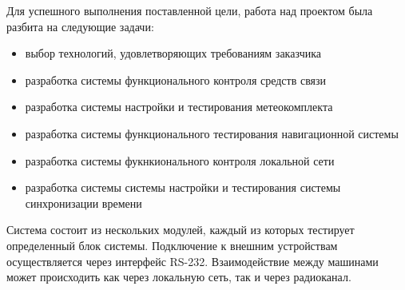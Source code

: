 Для успешного выполнения поставленной цели, работа над проектом была разбита на следующие задачи:
\begin{itemize}
    \item выбор технологий, удовлетворяющих требованиям заказчика
    \item разработка системы функционального контроля средств связи
    \item разработка системы настройки и тестирования метеокомплекта
    \item разработка системы функционального тестирования навигационной системы
    \item разработка системы фукнкионального контроля локальной сети
    \item разработка системы системы настройки и тестирования системы синхронизации времени
\end{itemize}

Система состоит из нескольких модулей, каждый из которых тестирует определенный блок системы.
Подключение к внешним устройствам осуществляется через интерфейс RS-232.
Взаимодействие между машинами может происходить как через локальную сеть, так и через радиоканал.
\clearpage
